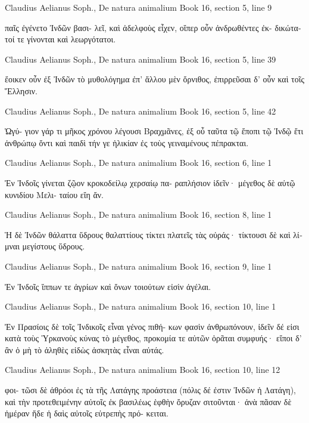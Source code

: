 \documentclass[12pt,letterpaper,twoside,final]{memoir}
\begin{document}
\begin{greek}
Claudius Aelianus Soph., De natura animalium 
Book 16, section 5, line 9

                                παῖς ἐγένετο Ἰνδῶν βασι-
λεῖ, καὶ ἀδελφοὺς εἶχεν, οἵπερ οὖν ἀνδρωθέντες ἐκ-
δικώτατοί τε γίνονται καὶ λεωργότατοι. 



Claudius Aelianus Soph., De natura animalium 
Book 16, section 5, line 39

ἔοικεν οὖν ἐξ Ἰνδῶν τὸ μυθολόγημα ἐπ' ἄλλου μὲν 
ὄρνιθος, ἐπιρρεῦσαι δ' οὖν καὶ τοῖς Ἕλλησιν. 



Claudius Aelianus Soph., De natura animalium 
Book 16, section 5, line 42

                                                        Ὠγύ-
γιον γάρ τι μῆκος χρόνου λέγουσι Βραχμᾶνες, ἐξ οὗ 
ταῦτα τῷ ἔποπι τῷ Ἰνδῷ ἔτι ἀνθρώπῳ ὄντι καὶ παιδὶ 
τήν γε ἡλικίαν ἐς τοὺς γειναμένους πέπρακται. 



Claudius Aelianus Soph., De natura animalium 
Book 16, section 6, line 1

Ἐν Ἰνδοῖς γίνεται ζῷον κροκοδείλῳ χερσαίῳ πα-
ραπλήσιον ἰδεῖν· μέγεθος δὲ αὐτῷ κυνιδίου Μελι-
ταίου εἴη ἄν. 



Claudius Aelianus Soph., De natura animalium 
Book 16, section 8, line 1

Ἡ δὲ Ἰνδῶν θάλαττα ὕδρους θαλαττίους τίκτει 
πλατεῖς τὰς οὐράς· τίκτουσι δὲ καὶ λίμναι μεγίστους 
ὕδρους. 



Claudius Aelianus Soph., De natura animalium 
Book 16, section 9, line 1

Ἐν Ἰνδοῖς ἵππων τε ἀγρίων καὶ ὄνων τοιούτων 
εἰσὶν ἀγέλαι. 



Claudius Aelianus Soph., De natura animalium 
Book 16, section 10, line 1

Ἐν Πρασίοις δὲ τοῖς Ἰνδικοῖς εἶναι γένος πιθή-
κων φασὶν ἀνθρωπόνουν, ἰδεῖν δέ εἰσι κατὰ τοὺς 
Ὑρκανοὺς κύνας τὸ μέγεθος, προκομία τε αὐτῶν ὁρᾶται 
συμφυής· εἴποι δ' ἂν ὁ μὴ τὸ ἀληθὲς εἰδὼς ἀσκητὰς 
εἶναι αὐτάς. 



Claudius Aelianus Soph., De natura animalium 
Book 16, section 10, line 12

                                                     φοι-
τῶσι δὲ ἀθρόοι ἐς τὰ τῆς Λατάγης προάστεια (πόλις 
δέ ἐστιν Ἰνδῶν ἡ Λατάγη), καὶ τὴν προτεθειμένην 
αὐτοῖς ἐκ βασιλέως ἑφθὴν ὄρυζαν σιτοῦνται· ἀνὰ 
πᾶσαν δὲ ἡμέραν ἥδε ἡ δαὶς αὐτοῖς εὐτρεπὴς πρό-  
κειται. 




\end{greek}
\end{document}
